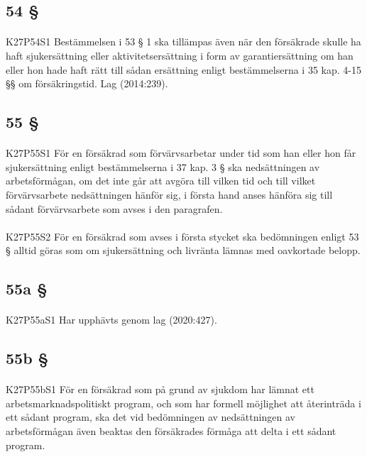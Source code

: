 \documentclass[a4paper,notitlepage,openany,10pt]{book}
\begin{document}
\subsection*{54 §}
\paragraph*{}
{\tiny K27P54S1}
Bestämmelsen i 53 § 1 ska tillämpas även när den försäkrade skulle ha haft sjukersättning eller aktivitetsersättning i form av garantiersättning om han eller hon hade haft rätt till sådan ersättning enligt bestämmelserna i 35 kap. 4-15 §§ om försäkringstid.
Lag (2014:239).
\subsection*{55 §}
\paragraph*{}
{\tiny K27P55S1}
För en försäkrad som förvärvsarbetar under tid som han eller hon får sjukersättning enligt bestämmelserna i 37 kap. 3 § ska nedsättningen av arbetsförmågan, om det inte går att avgöra till vilken tid och till vilket förvärvsarbete nedsättningen hänför sig, i första hand anses hänföra sig till sådant förvärvsarbete som avses i den paragrafen.
\paragraph*{}
{\tiny K27P55S2}
För en försäkrad som avses i första stycket ska bedömningen enligt 53 § alltid göras som om sjukersättning och livränta lämnas med oavkortade belopp.
\subsection*{55a §}
\paragraph*{}
{\tiny K27P55aS1}
Har upphävts genom
lag (2020:427).
\subsection*{55b §}
\paragraph*{}
{\tiny K27P55bS1}
För en försäkrad som på grund av sjukdom har lämnat ett arbetsmarknadspolitiskt program, och som har formell möjlighet att återinträda i ett sådant program, ska det vid bedömningen av nedsättningen av arbetsförmågan även beaktas den försäkrades förmåga att delta i ett sådant program.
\end{document}
